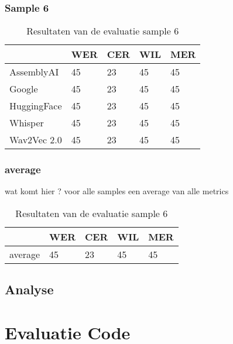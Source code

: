 \subsubsection{Sample 6}
\begin{table}[htbp]
    \centering
    \caption{Resultaten van de evaluatie sample 6}
    \label{tab:results_sample6}
    \begin{tabularx}{\textwidth}{|l|X|X|X|X|}
        \hline
        & \textbf{WER} & \textbf{CER} & \textbf{WIL} & \textbf{MER} \\ \hline
        AssemblyAI & 45 & 23 & 45 & 45 \\ \hline
        Google & 45 & 23 & 45 & 45 \\ \hline
        HuggingFace & 45 & 23 & 45 & 45 \\ \hline
        Whisper & 45 & 23 & 45 & 45 \\ \hline
        Wav2Vec 2.0 & 45 & 23 & 45 & 45 \\ \hline
    \end{tabularx}
\end{table}
\FloatBarrier

\subsubsection{average}
 wat komt hier ?
 voor alle samples een average van alle metrics
 \begin{table}[htbp]
     \centering
     \caption{Resultaten van de evaluatie sample 6}
     \label{tab:results_sample6}
     \begin{tabularx}{\textwidth}{|l|X|X|X|X|}
         \hline
         & \textbf{WER} & \textbf{CER} & \textbf{WIL} & \textbf{MER} \\ \hline
         average & 45 & 23 & 45 & 45 \\ \hline

     \end{tabularx}
 \end{table}
 \FloatBarrier 
 
\subsection{Analyse}

\section{Evaluatie Code}

